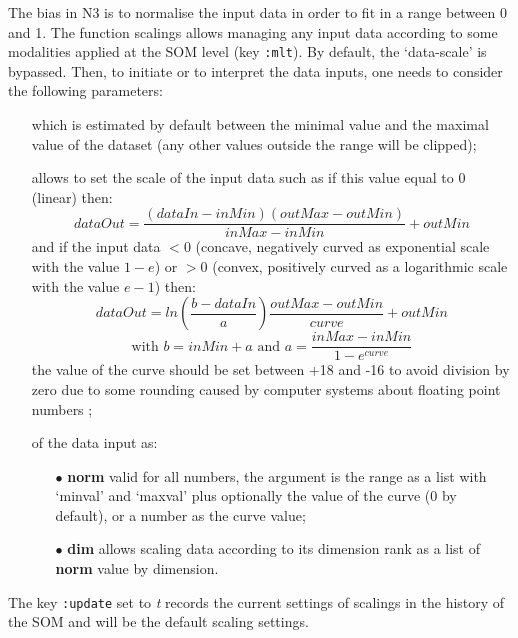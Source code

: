 \bigskip
\bigskip

\label{pt:as}

\bigskip

The bias in N3 is to normalise the input data in order to fit in a range between 0 and 1. The function \glspl{scaling} allows managing any input data according to some modalities applied at the SOM level (key \texttt{:mlt}). By default, the `data-scale' is bypassed. Then, to initiate or to interpret the data inputs, one needs to consider the following parameters:
\begin{itemize}
\item[]  which is estimated by default between the minimal value and the maximal value of the dataset (any other values outside the range will be clipped);
\item[]  allows to set the scale of the input data such as if this value equal to 0 (linear) then: 
$$dataOut=\frac{(dataIn-inMin)(outMax-outMin)}{inMax-inMin}+outMin$$
and if the input data $< 0$ (concave, negatively curved as exponential scale with the value $1-e$) or $> 0$ (convex, positively curved as a logarithmic scale with the value $e-1$) then:
$$dataOut=ln\left(\dfrac{b-dataIn}{a}\right)\dfrac{outMax-outMin}{curve}+outMin$$
$$\text{with } b=inMin+a \text{ and }  a=\dfrac{inMax-inMin}{1-e^{curve}}$$ the value of the curve should be set between +18 and -16 to avoid division by zero due to some rounding caused by computer systems about floating point numbers \citep{re};
\item[]  of the data input as:
\begin{itemize}
\item[$\bullet$] \textbf{norm} valid for all numbers, the argument is the range as a list with `minval' and `maxval' plus optionally the value of the curve (0 by default), or a number as the curve value; %
\item[$\bullet$] \textbf{dim} allows scaling data according to its dimension rank as a list of \textbf{norm} value by dimension.
\end{itemize}
\end{itemize}
The key \texttt{:update} set to \textit{t} records the current settings of \glspl{scaling} in the history of the SOM and will be the default scaling settings. 

